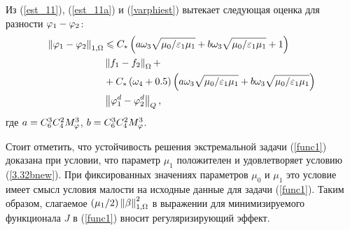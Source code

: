 Из (\ref{est_11}), (\ref{est_11a}) и (\ref{varphiest}) вытекает следующая оценка для разности $\varphi_1 - \varphi_2$:
\begin{equation}
	\label{est12}
	\begin{split}
		\left\Vert \varphi_1 - \varphi_2 \right\Vert_{1, \Omega} 
		&\leqslant  
			C_{*} 
			\left( 
				a \omega_3 
				\sqrt{\mu_0 / \varepsilon_1 \mu_1} 
				+ b \omega_3 
				\sqrt{\mu_0 / \varepsilon_1 \mu_1} 
				+ 1
			 \right) \\
			&\left\Vert f_1- f_2 \right\Vert_\Omega + \\
		& + C_{*} 
			\left( \omega_4 + 0.5 \right) 
			\left( 
				a \omega_3 
				\sqrt{\mu_0 / \varepsilon_1 \mu_1} 
				+ b \omega_3 
				\sqrt{\mu_0 / \varepsilon_1 \mu_1}
			 \right) \\
			&\left\Vert \varphi^d_1 - \varphi^d_2 \right\Vert_Q, 
	\end{split}
\end{equation} 
где $a = C_6^3 C_4^2 M_\varphi^3$, $b = C_6^3 C_4^2 M_\varphi^3$.



Стоит отметить, что устойчивость решения экстремальной задачи (\ref{func1}) доказана при условии, что параметр $\mu_1$ положителен и удовлетворяет условию (\ref{3.32bnew}). При фиксированных значениях параметров $\mu_0$ и $\mu_1$ это условие имеет смысл условия малости на исходные данные для задачи (\ref{func1}). Таким образом, слагаемое $(\mu_1/2) \left\Vert \beta \right\Vert_{1,\Omega}^2$ в выражении для минимизируемого функционала $J$ в (\ref{func1}) вносит регуляризирующий эффект.